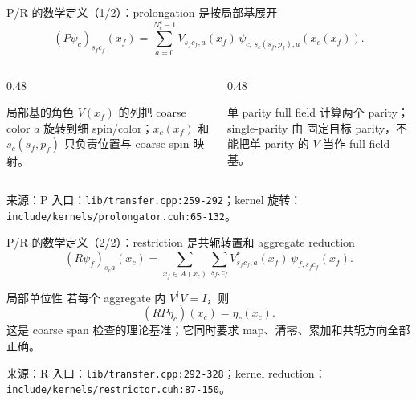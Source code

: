 \documentclass[UTF8,aspectratio=169,11pt]{ctexbeamer}
\newcommand{\source}[1]{\vspace{0.05em}\par{\raggedright\scriptsize\color{muted}来源：#1\par}}
\newcommand{\codepath}[1]{\nolinkurl{#1}}
\begin{document}
\begin{frame}[t]{P/R 的数学定义（1/2）：prolongation 是按局部基展开}
  \begin{equation*}
    (P\psi_c)_{s_f c_f}(x_f)
    =\sum_{a=0}^{N_c^c-1}
    V_{s_f c_f,a}(x_f)\,
    \psi_{c,\,s_c(s_f,p_f),a}(x_c(x_f)).
  \end{equation*}
  \vspace{0.10cm}
  \begin{columns}[T,totalwidth=\textwidth]
    \begin{column}{0.48\textwidth}
      \begin{block}{局部基的角色}
        \(V(x_f)\) 的列把 coarse color \(a\) 旋转到细 spin/color；\(x_c(x_f)\) 和 \(s_c(s_f,p_f)\) 只负责位置与 coarse-spin 映射。
      \end{block}
    \end{column}
    \begin{column}{0.48\textwidth}
      \begin{alertblock}{单 parity}
        full field 计算两个 parity；single-parity 由 \texttt{} 固定目标 parity，不能把单 parity 的 \(V\) 当作 full-field 基。
      \end{alertblock}
    \end{column}
  \end{columns}
  \source{P 入口：\codepath{lib/transfer.cpp:259-292}；kernel 旋转：\codepath{include/kernels/prolongator.cuh:65-132}。}
\end{frame}

\begin{frame}[t]{P/R 的数学定义（2/2）：restriction 是共轭转置和 aggregate reduction}
  \begin{equation*}
    (R\psi_f)_{s_c a}(x_c)
    =\sum_{x_f\in A(x_c)}\sum_{s_f,c_f}
    V^*_{s_f c_f,a}(x_f)\,
    \psi_{f,s_f c_f}(x_f).
  \end{equation*}
  \vspace{0.08cm}
  \begin{block}{局部单位性}
    若每个 aggregate 内 \(V^\dagger V=I\)，则
    \[
      (RP\eta_c)(x_c)=\eta_c(x_c).
    \]
    这是 coarse span 检查的理论基准；它同时要求 map、清零、累加和共轭方向全部正确。
  \end{block}
  \begin{center}
  \end{center}
  \source{R 入口：\codepath{lib/transfer.cpp:292-328}；kernel reduction：\codepath{include/kernels/restrictor.cuh:87-150}。}
\end{frame}
\end{document}
